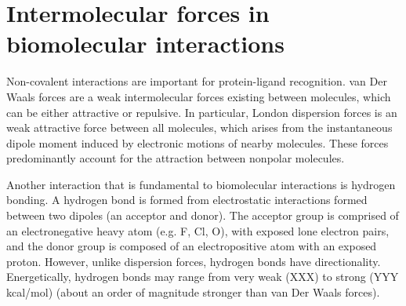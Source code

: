 
\section{Intermolecular forces in biomolecular interactions}



Non-covalent interactions are important for protein-ligand recognition.  van Der Waals forces are a weak intermolecular forces existing between molecules, which can be either attractive or repulsive. In particular, London dispersion forces is an weak attractive force between all molecules, which arises from the instantaneous dipole moment induced by electronic motions of nearby molecules. These forces predominantly account for the attraction between nonpolar molecules. 

Another interaction that is fundamental to biomolecular interactions is hydrogen bonding. 
A hydrogen bond is formed from electrostatic interactions formed between two dipoles (an acceptor and donor). The acceptor group is comprised of an electronegative heavy atom (e.g. F, Cl, O), with exposed lone electron pairs, and the donor group is composed of an electropositive atom with an exposed proton. However, unlike dispersion forces, hydrogen bonds have directionality. Energetically, hydrogen bonds may range from very weak (XXX) to strong (YYY kcal/mol) (about an order of magnitude stronger than van Der Waals forces).  %

